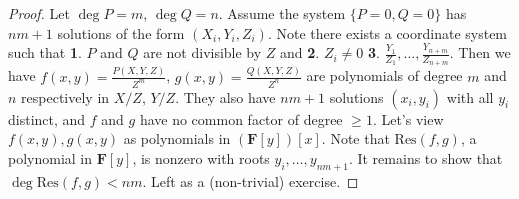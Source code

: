 \documentclass[12pt]{article}
\newcommand{\F}{\mathbf{F}}
\newcommand{\C}{\mathbb{C}}
\renewcommand{\P}{\mathbb{P}}
\newcommand{\Res}{\mathrm{Res}}
\begin{document}
    \begin{proof}
        Let $\deg P = m$, $\deg Q = n$. Assume the system $\{P = 0, Q = 0\}$ has $nm + 1$ solutions of the form $(X_i, Y_i, Z_i)$. Note there exists a coordinate system such that \textbf{1}. $P$ and $Q$ are not divisible by $Z$ and \textbf{2}. $Z_i \neq 0$ \textbf{3}. $\frac{Y_1}{Z_1}, \dots, \frac{Y_{n+m}}{Z_{n+m}}$. Then we have $f(x, y) = \frac{P(X, Y, Z)}{Z^m}$, $g(x, y) = \frac{Q(X, Y, Z)}{Z^n}$ are polynomials of degree $m$ and $n$ respectively in $X/Z$, $Y/Z$. They also have $nm + 1$ solutions $(x_i, y_i)$ with all $y_i$ distinct, and $f$ and $g$ have no common factor of degree $\geq 1$. Let's view $f(x, y), g(x, y)$ as polynomials in $(\F[y])[x]$. Note that $\Res(f, g)$, a polynomial in $\F[y]$, is nonzero with roots $y_i, \dots, y_{nm+1}$. It remains to show that $\deg \Res(f, g) < nm$. Left as a (non-trivial) exercise. 
    \end{proof}
\end{document}
